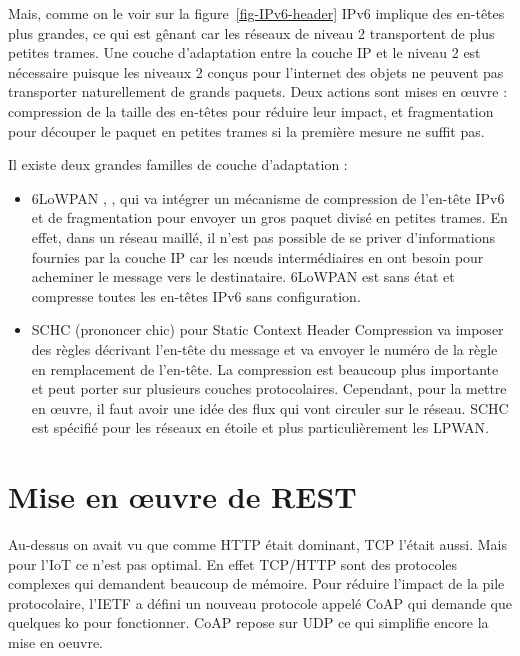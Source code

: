   
  
  
  
  
  Mais, comme on le voir sur la figure~\vref{fig-IPv6-header} IPv6 implique des en-têtes plus grandes, ce qui est gênant car les réseaux de niveau 2 transportent de plus petites trames.
  Une couche d'adaptation entre la couche IP et le niveau 2 est nécessaire puisque les niveaux 2 conçus pour l'internet des objets ne peuvent pas transporter naturellement de grands paquets. Deux actions sont mises en œuvre : compression de la taille des en-têtes pour réduire leur impact, et fragmentation pour découper le paquet en petites trames si la première mesure ne suffit pas. 

Il existe deux grandes familles de couche d'adaptation :

\begin{itemize}
 \item 6LoWPAN , , qui va intégrer un mécanisme de compression de l'en-tête IPv6 et de fragmentation pour envoyer un gros paquet divisé en petites trames. En effet, dans un réseau maillé, il n'est pas possible de se priver d'informations fournies par la couche IP car les nœuds intermédiaires en ont besoin pour acheminer le message vers le destinataire. 
6LoWPAN est sans état et compresse toutes les en-têtes IPv6 sans configuration. 
\item SCHC (prononcer chic) pour Static Context Header Compression  va imposer des règles décrivant l'en-tête du message et va envoyer le numéro de la règle en remplacement de l'en-tête. La compression est beaucoup plus importante et peut porter sur plusieurs couches protocolaires. Cependant, pour la mettre en œuvre, il faut avoir une idée des flux qui vont circuler sur le réseau. SCHC est spécifié pour les réseaux en étoile et plus particulièrement les LPWAN.

\end{itemize}

\section{Mise en \oe{}uvre de REST}
  
  Au-dessus on avait vu que comme HTTP était dominant, TCP l'était aussi. Mais pour l'IoT ce n'est pas optimal. En effet TCP/HTTP sont des protocoles complexes qui demandent beaucoup de mémoire. Pour réduire l'impact de la pile protocolaire, l'IETF a défini un nouveau protocole appelé CoAP qui demande que quelques ko pour fonctionner. CoAP repose sur UDP ce qui simplifie encore la mise en oeuvre. 
  
